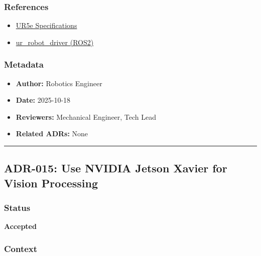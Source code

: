 \documentclass[
]{article}
\providecommand{\tightlist}{%
  \setlength{\itemsep}{0pt}\setlength{\parskip}{0pt}}
\begin{document}
\hypertarget{references-13}{%
\subsubsection{References}\label{references-13}}

\begin{itemize}
\tightlist
\item
  \href{https://www.universal-robots.com/products/ur5-robot/}{UR5e
  Specifications}
\item
  \href{https://github.com/UniversalRobots/Universal_Robots_ROS2_Driver}{ur\_robot\_driver
  (ROS2)}
\end{itemize}

\hypertarget{metadata-13}{%
\subsubsection{Metadata}\label{metadata-13}}

\begin{itemize}
\tightlist
\item
  \textbf{Author:} Robotics Engineer
\item
  \textbf{Date:} 2025-10-18
\item
  \textbf{Reviewers:} Mechanical Engineer, Tech Lead
\item
  \textbf{Related ADRs:} None
\end{itemize}

\begin{center}\rule{0.5\linewidth}{0.5pt}\end{center}

\hypertarget{adr-015-use-nvidia-jetson-xavier-for-vision-processing}{%
\subsection{ADR-015: Use NVIDIA Jetson Xavier for Vision
Processing}\label{adr-015-use-nvidia-jetson-xavier-for-vision-processing}}

\hypertarget{status-14}{%
\subsubsection{Status}\label{status-14}}

\textbf{Accepted}

\hypertarget{context-14}{%
\subsubsection{Context}\label{context-14}}
\end{document}
